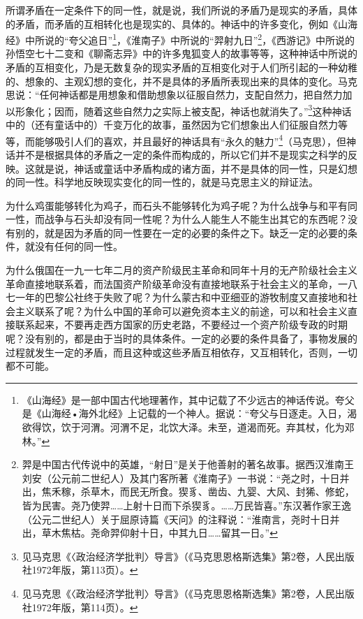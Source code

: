\documentclass[UTF8, 12pt, a4paper]{ctexrep}
\begin{document}
所谓矛盾在一定条件下的同一性，就是说，我们所说的矛盾乃是现实的矛盾，具体的矛盾，而矛盾的互相转化也是现实的、具体的。神话中的许多变化，例如《山海经》中所说的“夸父追日”\footnote{《山海经》是一部中国古代地理著作，其中记载了不少远古的神话传说。夸父是《山海经•海外北经》上记载的一个神人。据说：“夸父与日逐走。入日，渴欲得饮，饮于河渭。河渭不足，北饮大泽。未至，道渴而死。弃其杖，化为邓林。”}，《淮南子》中所说的“羿射九日”\footnote{羿是中国古代传说中的英雄，“射日”是关于他善射的著名故事。据西汉淮南王刘安（公元前二世纪人）及其门客所著《淮南子》一书说：“尧之时，十日并出，焦禾稼，杀草木，而民无所食。猰豸、凿齿、九婴、大风、封狶、修蛇，皆为民害。尧乃使羿……上射十日而下杀猰豸。……万民皆喜。”东汉著作家王逸（公元二世纪人）关于屈原诗篇《天问》的注释说：“淮南言，尧时十日并出，草木焦枯。尧命羿仰射十日，中其九日……留其一日。”}，《西游记》中所说的孙悟空七十二变和《聊斋志异》中的许多鬼狐变人的故事等等，这种神话中所说的矛盾的互相变化，乃是无数复杂的现实矛盾的互相变化对于人们所引起的一种幼稚的、想象的、主观幻想的变化，并不是具体的矛盾所表现出来的具体的变化。马克思说：“任何神话都是用想象和借助想象以征服自然力，支配自然力，把自然力加以形象化；因而，随着这些自然力之实际上被支配，神话也就消失了。”\footnote{见马克思《〈政治经济学批判〉导言》（《马克思恩格斯选集》第2卷，人民出版社1972年版，第113页）。}这种神话中的（还有童话中的）千变万化的故事，虽然因为它们想象出人们征服自然力等等，而能够吸引人们的喜欢，并且最好的神话具有“永久的魅力”\footnote{见马克思《〈政治经济学批判〉导言》（《马克思恩格斯选集》第2卷，人民出版社1972年版，第114页）。}（马克思），但神话并不是根据具体的矛盾之一定的条件而构成的，所以它们并不是现实之科学的反映。这就是说，神话或童话中矛盾构成的诸方面，并不是具体的同一性，只是幻想的同一性。科学地反映现实变化的同一性的，就是马克思主义的辩证法。

为什么鸡蛋能够转化为鸡子，而石头不能够转化为鸡子呢？为什么战争与和平有同一性，而战争与石头却没有同一性呢？为什么人能生人不能生出其它的东西呢？没有别的，就是因为矛盾的同一性要在一定的必要的条件之下。缺乏一定的必要的条件，就没有任何的同一性。

为什么俄国在一九一七年二月的资产阶级民主革命和同年十月的无产阶级社会主义革命直接地联系着，而法国资产阶级革命没有直接地联系于社会主义的革命，一八七一年的巴黎公社终于失败了呢？为什么蒙古和中亚细亚的游牧制度又直接地和社会主义联系了呢？为什么中国的革命可以避免资本主义的前途，可以和社会主义直接联系起来，不要再走西方国家的历史老路，不要经过一个资产阶级专政的时期呢？没有别的，都是由于当时的具体条件。一定的必要的条件具备了，事物发展的过程就发生一定的矛盾，而且这种或这些矛盾互相依存，又互相转化，否则，一切都不可能。
\end{document}

